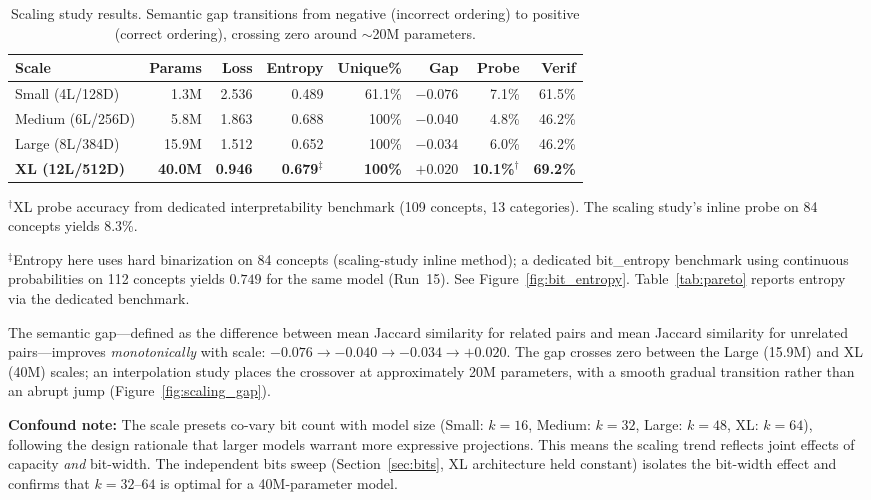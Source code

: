 \documentclass[11pt,a4paper]{article}
\begin{document}
\begin{table}[h]
\centering
\caption{Scaling study results. Semantic gap transitions from negative (incorrect ordering) to positive (correct ordering), crossing zero around $\sim$20M parameters.}
\label{tab:scaling}
\begin{tabular}{lrrrrrrr}
\toprule
Scale & Params & Loss & Entropy & Unique\% & Gap & Probe & Verif \\
\midrule
Small (4L/128D)  & 1.3M  & 2.536 & 0.489 & 61.1\%  & $-0.076$ & 7.1\% & 61.5\% \\
Medium (6L/256D) & 5.8M  & 1.863 & 0.688 & 100\%   & $-0.040$ & 4.8\% & 46.2\% \\
Large (8L/384D)  & 15.9M & 1.512 & 0.652 & 100\%   & $-0.034$ & 6.0\% & 46.2\% \\
\textbf{XL (12L/512D)} & \textbf{40.0M} & \textbf{0.946} & \textbf{0.679}$^\ddagger$ & \textbf{100\%} & $\mathbf{+0.020}$ & \textbf{10.1\%}$^\dagger$ & \textbf{69.2\%} \\
\bottomrule
\end{tabular}
\vspace{2pt}

{\footnotesize $^\dagger$XL probe accuracy from dedicated interpretability benchmark (109 concepts, 13 categories). The scaling study's inline probe on 84 concepts yields 8.3\%.}

{\footnotesize $^\ddagger$Entropy here uses hard binarization on 84 concepts (scaling-study inline method); a dedicated bit\_entropy benchmark using continuous probabilities on 112 concepts yields $0.749$ for the same model (Run~15). See Figure~\ref{fig:bit_entropy}. Table~\ref{tab:pareto} reports entropy via the dedicated benchmark.}
\end{table}

The semantic gap---defined as the difference between mean Jaccard similarity for related pairs and mean Jaccard similarity for unrelated pairs---improves \emph{monotonically} with scale: $-0.076 \rightarrow -0.040 \rightarrow -0.034 \rightarrow +0.020$. The gap crosses zero between the Large (15.9M) and XL (40M) scales; an interpolation study places the crossover at approximately 20M parameters, with a smooth gradual transition rather than an abrupt jump (Figure~\ref{fig:scaling_gap}).

\textbf{Confound note:} The scale presets co-vary bit count with model size (Small: $k=16$, Medium: $k=32$, Large: $k=48$, XL: $k=64$), following the design rationale that larger models warrant more expressive projections. This means the scaling trend reflects joint effects of capacity \emph{and} bit-width. The independent bits sweep (Section~\ref{sec:bits}, XL architecture held constant) isolates the bit-width effect and confirms that $k=32$--$64$ is optimal for a 40M-parameter model.
\end{document}
